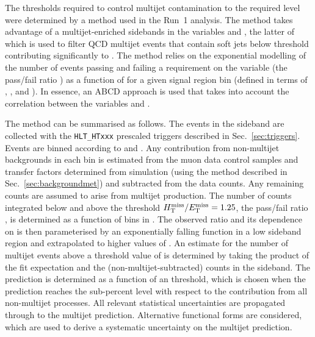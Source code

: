 The \alphat thresholds required to control multijet contamination to
the required level were determined by a method used in the Run~1
analysis. The method takes advantage of a multijet-enriched sidebands
in the variables \alphat and \mhtmet, the latter of which is used to
filter QCD multijet events that contain soft jets below threshold
contributing significantly to \mht. The method relies on the
exponential modelling of the number of events passing and failing a
requirement on the variable \mhtmet (\ie the pass/fail ratio \rmhtmet)
as a function of \alphat for a given signal region bin (defined in
terms of \njet, \nb, and \scalht). In essence, an ABCD approach is
used that takes into account the correlation between the variables
\rmhtmet and \alphat.

The method can be summarised as follows. The events in the sideband
are collected with the \texttt{HLT\_HTxxx} prescaled triggers
described in Sec.~\ref{sec:triggers}. Events are binned according to \alphat
and \mhtmet. Any contribution from non-multijet backgrounds in each
bin is estimated from the muon data control samples and transfer
factors determined from simulation (using the method described in
Sec.~\ref{sec:backgroundmet}) and subtracted from the data counts. Any remaining counts
are assumed to arise from multijet production. The number of counts
integrated below and above the threshold $\mhtmet = 1.25$, \ie the
pass/fail ratio \rmhtmet, is determined as a function of bins in
\alphat. The observed ratio and its dependence on \alphat is then
parameterised by an exponentially falling function in a low \alphat
sideband region and extrapolated to higher values of \alphat. An
estimate for the number of multijet events above a threshold value of
\alphat is determined by taking the product of the fit expectation and
the (non-multijet-subtracted) counts in the \mhtmet sideband. The
prediction is determined as a function of an \alphat threshold, which
is chosen when the prediction reaches the sub-percent level with
respect to the contribution from all non-multijet processes. All
relevant statistical uncertainties are propagated through to the
multijet prediction. Alternative functional forms are considered,
which are used to derive a systematic uncertainty on the multijet
prediction. 

